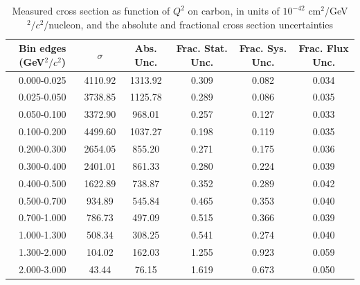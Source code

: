 \documentclass[../main.tex]{subfiles}
\begin{document}
\begin{table}
  \centering
  \renewcommand{\arraystretch}{1.15}
  \caption{Measured cross section as function of $Q^2$ on carbon, in units of $10^{-42}$ $\text{cm}^2$/GeV${}^2/c{}^2$/nucleon, and the absolute and fractional cross section uncertainties}
    \begin{tabular}{c||c|c||c|c|c}
      Bin edges (GeV${}^2/c{}^2$) &  $\sigma$  &  Abs. Unc.  &  Frac. Stat. Unc.  &  Frac. Sys. Unc.  &  Frac. Flux Unc. \\
      \hline
      \hline
      0.000-0.025 & 4110.92 & 1313.92 & 0.309 & 0.082 & 0.034\\
      0.025-0.050 & 3738.85 & 1125.78 & 0.289 & 0.086 & 0.035\\
      0.050-0.100 & 3372.90 & 968.01 & 0.257 & 0.127 & 0.033\\
      0.100-0.200 & 4499.60 & 1037.27 & 0.198 & 0.119 & 0.035\\
      0.200-0.300 & 2654.05 & 855.20 & 0.271 & 0.175 & 0.036\\
      0.300-0.400 & 2401.01 & 861.33 & 0.280 & 0.224 & 0.039\\
      0.400-0.500 & 1622.89 & 738.87 & 0.352 & 0.289 & 0.042\\
      0.500-0.700 & 934.89 & 545.84 & 0.465 & 0.353 & 0.040\\
      0.700-1.000 & 786.73 & 497.09 & 0.515 & 0.366 & 0.039\\
      1.000-1.300 & 508.34 & 308.25 & 0.541 & 0.274 & 0.040\\
      1.300-2.000 & 104.02 & 162.03 & 1.255 & 0.923 & 0.059\\
      2.000-3.000 & 43.44 & 76.15 & 1.619 & 0.673 & 0.050
    \end{tabular}
  \label{tbl:datanucleonnuc6q2a}
\end{table}
\pagebreak
\end{document}
